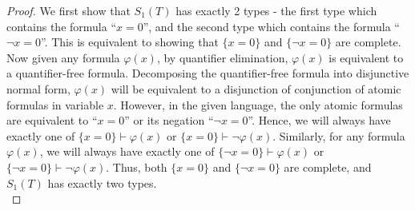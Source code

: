 \documentclass{article}
\begin{document}
\begin{enumerate}[label={\bf Q\arabic*:}]
\begin{proof}
      We first show that $S_1(T)$ has exactly 2 types - the first type
      which contains the formula ``$x=0$'', and the second type which
      contains the formula ``$\neg x=0$''. This is equivalent to showing
      that $\{x=0\}$ and $\{\neg x=0\}$ are complete. Now
      given any formula $\varphi(x)$, by quantifier elimination,
      $\varphi(x)$ is equivalent to a quantifier-free formula. Decomposing
      the quantifier-free formula into disjunctive normal form,
      $\varphi(x)$ will be equivalent to a disjunction of conjunction of
      atomic formulas in variable $x$. However, in the given language, the
      only atomic formulas are equivalent to ``$x=0$'' or its negation
      ``$\neg x=0$''. Hence, we will always have exactly one of
      $\{x=0\}\vdash\varphi(x)$ or $\{x=0\}\vdash\neg\varphi(x)$.
      Similarly, for any formula $\varphi(x)$, we will always have exactly
      one of $\{\neg x=0\}\vdash\varphi(x)$ or $\{\neg
      x=0\}\vdash\neg\varphi(x)$.  Thus, both $\{x=0\}$ and $\{\neg x=0\}$
      are complete, and $S_1(T)$ has exactly two types. \\



\end{proof}
\end{enumerate}
\end{document}

